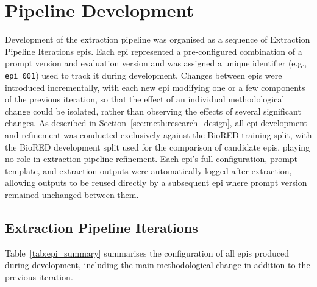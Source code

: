 \section{Pipeline Development}
\label{sec:meth:pipeline_development}
Development of the extraction pipeline was organised as a sequence of Extraction Pipeline Iterations \glspl{epi}. Each \gls{epi} represented a pre-configured combination of a prompt version and evaluation version and was assigned a unique identifier (e.g., \texttt{epi\_001}) used to track it during development. Changes between \glspl{epi} were introduced incrementally, with each new \gls{epi} modifying one or a few components of the previous iteration, so that the effect of an individual methodological change could be isolated, rather than observing the effects of several significant changes. As described in Section~\ref{sec:meth:research_design}, all \gls{epi} development and refinement was conducted exclusively against the BioRED training split, with the BioRED development split used for the comparison of candidate \glspl{epi}, playing no role in extraction pipeline refinement. Each \gls{epi}'s full configuration, prompt template, and extraction outputs were automatically logged after extraction, allowing outputs to be reused directly by a subsequent \gls{epi} where prompt version remained unchanged between them.

\subsection{Extraction Pipeline Iterations}
\label{subsec:meth:extraction_pipeline_iterations}
Table~\ref{tab:epi_summary} summarises the configuration of all \glspl{epi} produced during development, including the main methodological change in addition to the previous iteration.

